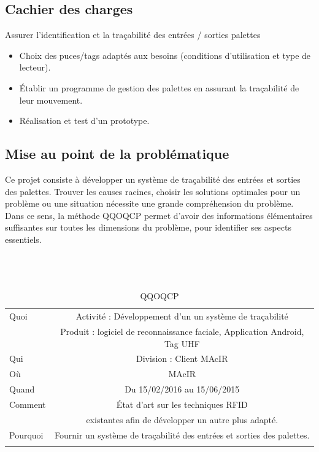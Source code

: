 \documentclass[11pt, a4paper, twoside]{book}
\begin{document}
\subsection{Cachier des charges}
Assurer l’identification et la traçabilité des entrées / sorties palettes
\begin{itemize}
\item Choix des puces/tags adaptés aux besoins (conditions d’utilisation et type de lecteur).
\item Établir un programme de gestion des palettes en assurant la traçabilité de leur mouvement.
\item Réalisation et test d’un prototype.\\
\end{itemize}
\subsection{Mise au point de la problématique}
Ce projet consiste à développer un système de traçabilité des entrées et sorties des palettes. Trouver les causes racines, choisir les solutions optimales pour un problème ou une situation nécessite une grande compréhension du problème. Dans ce sens, la méthode QQOQCP permet d'avoir des informations élémentaires suffisantes sur toutes les dimensions du problème, pour identifier ses aspects essentiels.\\\\\\\
        
\begin{longtable}{|l|c|}
  \hline
  Quoi & Activité : Développement d’un un système de traçabilité \\
       &  Produit : logiciel de reconnaissance faciale, Application Android, Tag UHF \\
  \hline
  Qui & Division : Client MAcIR\\
  \hline
  Où & MAcIR\\
  \hline
  Quand & Du 15/02/2016 au 15/06/2015\\
  \hline
  Comment & État d’art sur les techniques RFID \\
          &  existantes afin de développer un autre plus adapté.\\
  \hline
  Pourquoi & Fournir un système de traçabilité des entrées et sorties des palettes.\\
  \hline
  
\caption{QQOQCP}
\end{longtable}
\end{document}
